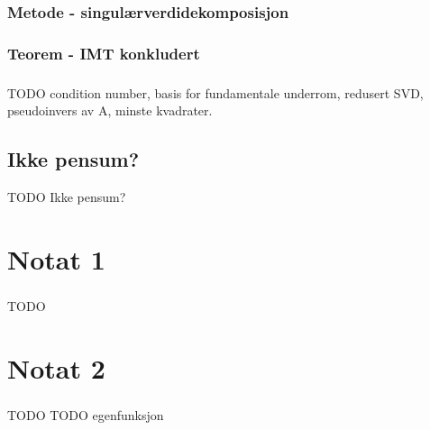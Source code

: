 \documentclass{article}
\begin{document}
      \subsubsection{Metode - singulærverdidekomposisjon}
        
      \subsubsection{Teorem - IMT konkludert}
        
      \subsubsection{}
        TODO condition number, basis for fundamentale underrom,
             redusert SVD, pseudoinvers av A, minste kvadrater.
    \subsection{Ikke pensum?}
      TODO Ikke pensum?
  \section{Notat 1}
    \subsubsection{}
      TODO
  \section{Notat 2}
    \subsubsection{}
      TODO
  TODO egenfunksjon
\end{document}
